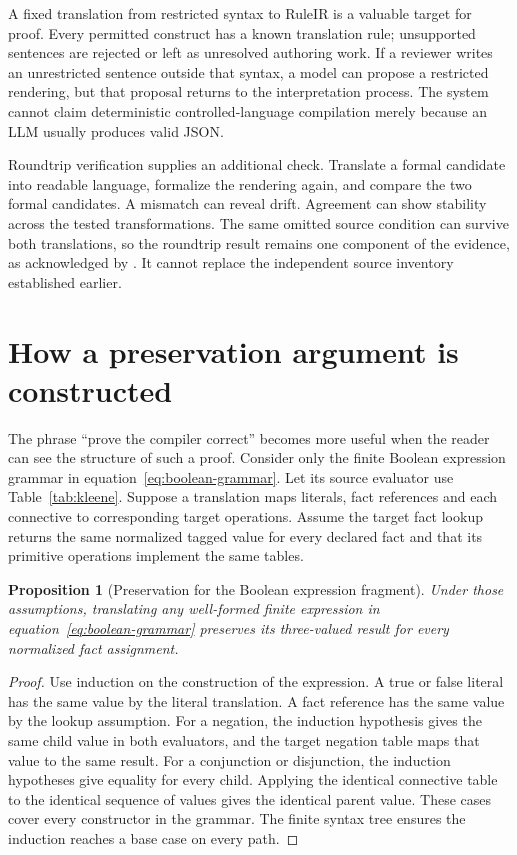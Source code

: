\documentclass[12pt,a4paper,oneside,openany]{book}
\newtheorem{proposition}{Proposition}[chapter]
\begin{document}
A fixed translation from restricted syntax to RuleIR is a valuable target for
proof. Every permitted construct has a known translation rule; unsupported
sentences are rejected or left as unresolved authoring work. If a reviewer
writes an unrestricted sentence outside that syntax, a model can propose a
restricted rendering, but that proposal returns to the interpretation process.
The system cannot claim deterministic controlled-language compilation merely
because an LLM usually produces valid JSON.

Roundtrip verification supplies an additional check. Translate a formal
candidate into readable language, formalize the rendering again, and compare
the two formal candidates. A mismatch can reveal drift. Agreement can show
stability across the tested transformations. The same omitted source condition
can survive both translations, so the roundtrip result remains one component
of the evidence, as acknowledged by \citet[method and limitations]{roundtrip2026}.
It cannot replace the independent source inventory established earlier.

\section{How a preservation argument is constructed}
\label{merge:M03:08}

\label{sec:proof-induction}
The phrase ``prove the compiler correct'' becomes more useful when the reader
can see the structure of such a proof. Consider only the finite Boolean
expression grammar in equation~\eqref{eq:boolean-grammar}. Let its source
evaluator use Table~\ref{tab:kleene}. Suppose a translation maps literals,
fact references and each connective to corresponding target operations.
Assume the target fact lookup returns the same normalized tagged value for
every declared fact and that its primitive operations implement the same
tables.

\begin{proposition}[Preservation for the Boolean expression fragment]
Under those assumptions, translating any well-formed finite expression in
equation~\eqref{eq:boolean-grammar} preserves its three-valued result for every
normalized fact assignment.
\label{prop:boolean-preservation}
\end{proposition}
\begin{proof}
Use induction on the construction of the expression. A true or false literal
has the same value by the literal translation. A fact reference has the same
value by the lookup assumption. For a negation, the induction hypothesis gives
the same child value in both evaluators, and the target negation table maps
that value to the same result. For a conjunction or disjunction, the induction
hypotheses give equality for every child. Applying the identical connective
table to the identical sequence of values gives the identical parent value.
These cases cover every constructor in the grammar. The finite syntax tree
ensures the induction reaches a base case on every path.
\end{proof}
\end{document}
